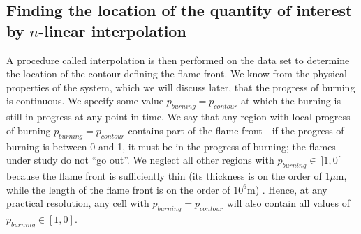 \subsection{Finding the location of the quantity of interest by $n$-linear interpolation} A procedure called interpolation is then performed on the data set to determine the location of the contour defining the flame front. We know from the physical properties of the system, which we will discuss later, that the progress of burning is continuous. We specify some value $p_{burning} = p_{contour}$ at which the burning is still in progress at any point in time. We say that any region with local progress of burning $p_{burning} = p_{contour}$ contains part of the flame front---if the progress of burning is between 0 and 1, it must be in the progress of burning; the flames under study do not ``go out''. We neglect all other regions with $p_{burning} \in \ ]1,0[$ because the flame front is sufficiently thin (its thickness is on the order of $1 \mu\mathrm{m}$, while the length of the flame front is on the order of $10^6\mathrm{m}$) \citep{Timmes1994}. Hence, at any practical resolution, any cell with $p_{burning} = p_{contour}$ will also contain all values of $p_{burning} \in [1,0]$. 

